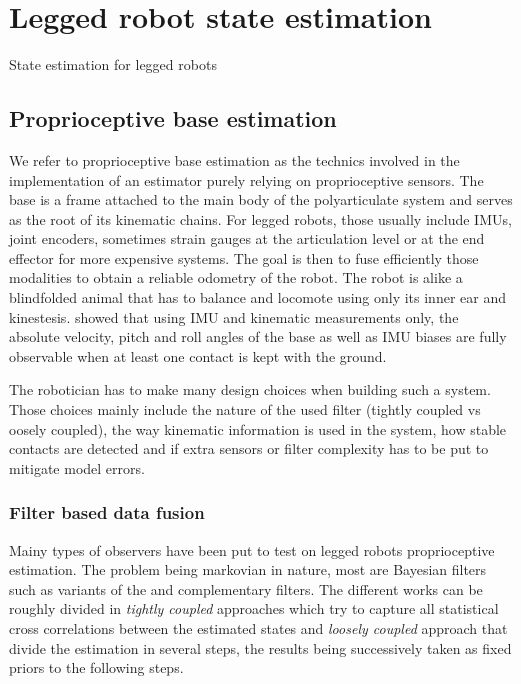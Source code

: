 \chapter{Legged robot state estimation}
State estimation for legged robots 


\section{Proprioceptive base estimation}
 We refer to proprioceptive base estimation as the technics involved in the implementation of an estimator purely relying
 on proprioceptive sensors. The base is a frame attached to the main body of the polyarticulate system and serves
 as the root of its kinematic chains. For legged robots, those usually include IMUs, joint encoders, sometimes strain gauges at the 
 articulation level or at the end effector for more expensive systems. The goal is then to fuse efficiently those 
 modalities to obtain a reliable odometry of the robot. The robot is alike a blindfolded animal that has to balance and locomote using 
 only its inner ear and kinestesis. \cite{bloesch2013state,rotella2014state} showed that using IMU and kinematic measurements 
 only, the absolute velocity, pitch and roll angles of the base as well as IMU biases are fully observable when at least one contact 
 is kept with the ground.

 The robotician has to make many design choices when building such a system. Those choices mainly include the nature of the used filter (tightly coupled vs oosely coupled), 
 the way kinematic information is used in the system, how stable contacts are detected and if extra sensors or filter complexity
 has to be put to mitigate model errors.
 

\subsection{Filter based data fusion}
Mainy types of observers have been put to test on legged robots proprioceptive estimation. The problem being markovian in nature,
most are Bayesian filters such as variants of the \KalmanF \cite{kalman1960new} and complementary filters. The different works can be 
roughly divided in \textit{tightly coupled} approaches which try to capture all statistical cross correlations between the estimated states
and \textit{loosely coupled} approach that divide the estimation in several steps, the results being successively taken as fixed priors to the 
following steps.







